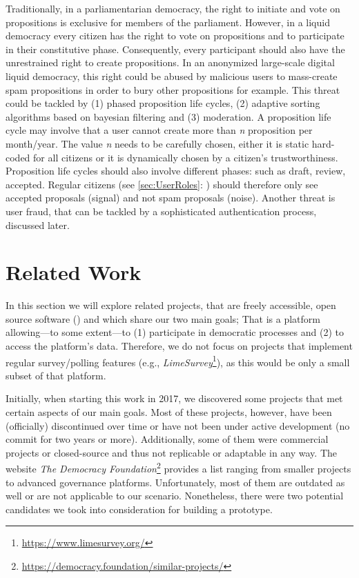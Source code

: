 Traditionally, in a parliamentarian democracy, the right to initiate and vote on propositions is exclusive for members of the parliament.
However, in a liquid democracy every citizen has the right to vote on propositions and to participate in their constitutive phase. Consequently, every participant should also have the unrestrained right to create propositions. In an anonymized large-scale digital liquid democracy, this right could be abused by malicious users to mass-create spam propositions in order to bury other propositions for example. This threat could be tackled by (1) phased proposition life cycles, (2) adaptive sorting algorithms based on bayesian filtering and (3) moderation. A proposition life cycle may involve that a user cannot create more than \textit{n} proposition per month/year. The value \textit{n} needs to be carefully chosen, either it is static hard-coded for all citizens or it is dynamically chosen by a citizen’s trustworthiness. Proposition life cycles should also involve different phases: such as draft, review, accepted. Regular citizens (see \autoref{sec:UserRoles}: ) should therefore only see accepted proposals (signal) and not spam proposals (noise). Another threat is user fraud, that can be tackled by a sophisticated authentication process, discussed later.



\section{Related Work}
\label{sec:RelatedWork}

In this section we will explore related projects, that are freely accessible, open source software () and which share our two main goals; That is a platform allowing---to some extent---to (1) participate in democratic processes and (2) to access the platform’s data. Therefore, we do not focus on projects that implement regular survey/polling features (e.g., \textit{LimeSurvey}\footnote{\url{https://www.limesurvey.org/}}), as this would be only a small subset of that platform.

Initially, when starting this work in 2017, we discovered some projects that met certain aspects of our main goals. Most of these projects, however, have been (officially) discontinued over time or have not been under active development (no commit for two years or more). Additionally, some of them were commercial projects or closed-source and thus not replicable or adaptable in any way. The website \textit{The Democracy Foundation}\footnote{\url{https://democracy.foundation/similar-projects/}} provides a list ranging from smaller projects to advanced governance platforms. Unfortunately, most of them are outdated as well or are not applicable to our scenario. Nonetheless, there were two potential candidates we took into consideration for building a prototype.

